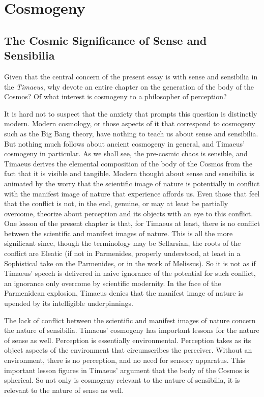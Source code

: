 \chapter{Cosmogeny} %
\label{cha:cosmogeny}

\section{The Cosmic Significance of Sense and Sensibilia} %
\label{sec:the_cosmic_significance_of_sensibilia}

Given that the central concern of the present essay is with sense and sensibilia in the \emph{Timaeus}, why devote an entire chapter on the generation of the body of the Cosmos? Of what interest is cosmogeny to a philosopher of perception? 

It is hard not to suspect that the anxiety that prompts this question is distinctly modern. Modern cosmology, or those aspects of it that correspond to cosmogeny such as the Big Bang theory, have nothing to teach us about sense and sensibilia. But nothing much follows about ancient cosmogeny in general, and Timaeus' cosmogeny in particular. As we shall see, the pre-cosmic chaos is sensible, and Timaeus derives the elemental composition of the body of the Cosmos from the fact that it is visible and tangible. Modern thought about sense and sensibilia is animated by the worry that the scientific image of nature is potentially in conflict with the manifest image of nature that experience affords us. Even those that feel that the conflict is not, in the end, genuine, or may at least be partially overcome, theorize about perception and its objects with an eye to this conflict. One lesson of the present chapter is that, for Timaeus at least, there is no conflict between the scientific and manifest images of nature. This is all the more significant since, though the terminology may be Sellarsian, the roots of the conflict are Eleatic (if not in Parmenides, properly understood, at least in a Sophistical take on the Parmenides, or in the work of Melissus). So it is not as if Timaeus' speech is delivered in naive ignorance of the potential for such conflict, an ignorance only overcome by scientific modernity. In the face of the Parmenidean explosion, Timaeus denies that the manifest image of nature is upended by its intelligible underpinnings. 

The lack of conflict between the scientific and manifest images of nature concern the nature of sensibilia. Timaeus' cosmogeny has important lessons for the nature of sense as well. Perception is essentially environmental. Perception takes as its object aspects of the environment that circumscribes the perceiver. Without an environment, there is no perception, and no need for sensory apparatus. This important lesson figures in Timaeus' argument that the body of the Cosmos is spherical. So not only is cosmogeny relevant to the nature of sensibilia, it is relevant to the nature of sense as well.

